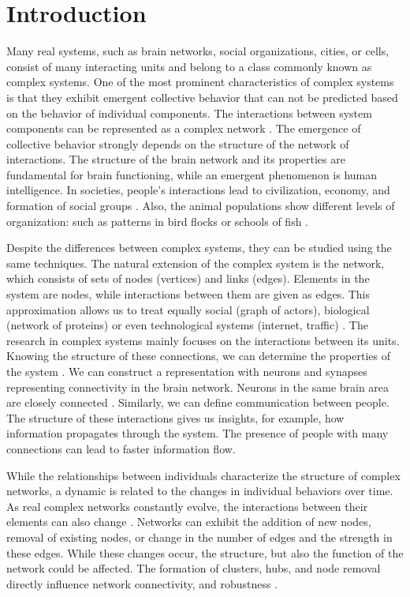 \chapter{Introduction} %

Many real systems, such as brain networks, social organizations, cities, or cells, consist of many interacting units and belong to a class commonly known as complex systems. One of the most prominent characteristics of complex systems is that they exhibit emergent collective behavior that can not be predicted based on the behavior of individual components. The interactions between system components can be represented as a complex network \cite{kwapien2012}. The emergence of collective behavior strongly depends on the structure of the network of interactions. The structure of the brain network and its properties are fundamental for brain functioning, while an emergent phenomenon is human intelligence. In societies, people's interactions lead to civilization, economy, and formation of social groups \cite{thurner2018}.
Also, the animal populations show different levels of organization: such as patterns in bird flocks or schools of fish \cite{thurner2018}.

Despite the differences between complex systems, they can be studied using the same techniques. The natural extension of the complex system is the network, which consists of sets of nodes (vertices) and links (edges). Elements in the system are nodes, while interactions between them are given as edges. This approximation allows us to treat equally social \cite{myers2014, sarigol2014} (graph of actors), biological (network of proteins) \cite{fraiman2009ising, schneider2011modeling} or even technological systems (internet, traffic) \cite{costa2007characterization, costa2011analyzing, newman2003structure}. The research in complex systems mainly focuses on the interactions between its units. Knowing the structure of these connections, we can determine the properties of the system \cite{ladyman2013}. We can construct a representation with neurons and synapses representing connectivity in the brain network. Neurons in the same brain area are closely connected \cite{latora2017complex}. Similarly, we can define communication between people. The structure of these interactions gives us insights, for example, how information propagates through the system. The presence of people with many connections can lead to faster information flow. 

While the relationships between individuals characterize the structure of complex networks, a dynamic is related to the changes in individual behaviors over time. As real complex networks constantly evolve, the interactions between their elements can also change \cite{thurner2018}. Networks can exhibit the addition of new nodes, removal of existing nodes, or change in the number of edges and the strength in these edges.
While these changes occur, the structure, but also the function of the network could be affected. The formation of clusters, hubs, and node removal directly influence network connectivity, and robustness \cite{boccaletti2006complex}. 

